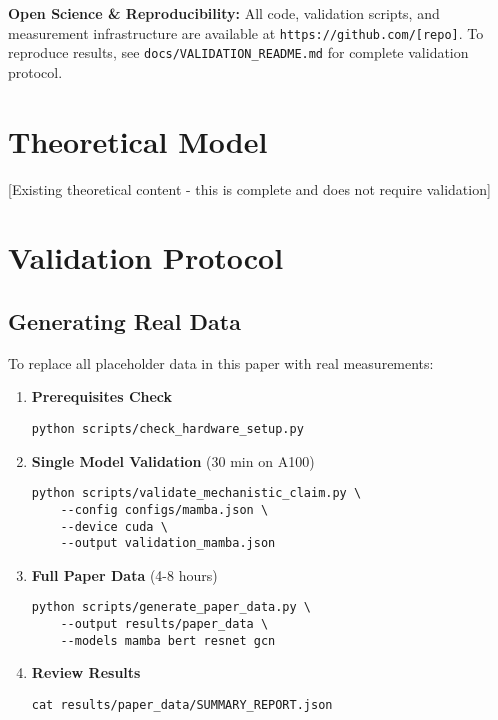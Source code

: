 \documentclass{article}
\begin{document}
\textbf{Open Science \& Reproducibility:} All code, validation scripts, and measurement infrastructure are available at \texttt{https://github.com/[repo]}. To reproduce results, see \texttt{docs/VALIDATION\_README.md} for complete validation protocol.




\appendix

\section{Theoretical Model}
\label{app:theoretical_model}

[Existing theoretical content - this is complete and does not require validation]

\section{Validation Protocol}
\label{app:validation}

\subsection{Generating Real Data}

To replace all placeholder data in this paper with real measurements:

\begin{enumerate}
    \item \textbf{Prerequisites Check}
    \begin{verbatim}
python scripts/check_hardware_setup.py
    \end{verbatim}

    \item \textbf{Single Model Validation} (30 min on A100)
    \begin{verbatim}
python scripts/validate_mechanistic_claim.py \
    --config configs/mamba.json \
    --device cuda \
    --output validation_mamba.json
    \end{verbatim}

    \item \textbf{Full Paper Data} (4-8 hours)
    \begin{verbatim}
python scripts/generate_paper_data.py \
    --output results/paper_data \
    --models mamba bert resnet gcn
    \end{verbatim}

    \item \textbf{Review Results}
    \begin{verbatim}
cat results/paper_data/SUMMARY_REPORT.json
    \end{verbatim}
\end{enumerate}
\end{document}
